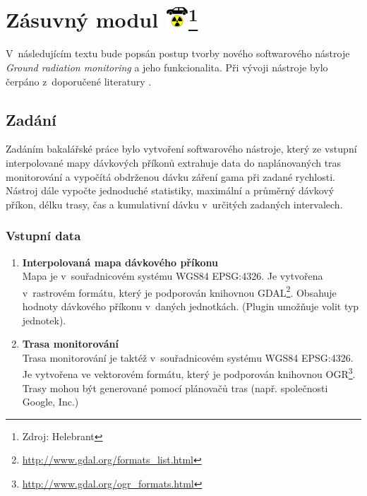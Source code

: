 \chapter[Zásuvný modul]{Zásuvný
modul \includegraphics[scale=0.65]{./pictures/ikonka.png}\footnote{Zdroj:
Helebrant}}
\label{4-plugin}

V~následujícím textu bude popsán postup tvorby nového softwarového
nástroje \textit{Ground radiation monitoring} a jeho
funkcionalita. Při vývoji nástroje bylo čerpáno z~doporučené
literatury \cite{masteringQgis}\cite{diveIntoPython}\cite{rapidPyQt}.

\section{Zadání} Zadáním bakalářské práce bylo vytvoření softwarového
nástroje, který ze vstupní interpolované mapy dávkových příkonů
extrahuje data do naplánovaných tras moni\-torování a vypočítá obdrženou
dávku záření gama při zadané rychlosti. Nástroj dále vypočte
jednoduché statistiky, maximální a průměrný dávkový příkon, délku
trasy, čas a kumulativní dávku v~určitých zadaných intervalech.

\subsection{Vstupní data}
\label{subsec:vstupniData}
\begin{enumerate}
	\item \textbf{Interpolovaná mapa dávkového příkonu} \\ Mapa je
v~souřadnicovém systému WGS84 EPSG:4326. Je vytvořena v~rastrovém
formátu, který je podporován knihovnou
GDAL\footnote{\url{http://www.gdal.org/formats\_list.html}}. Obsahuje
hodnoty dávkového příkonu v~daných jednotkách. (Plugin umožňuje volit
typ jednotek).
	\item \textbf{Trasa monitorování} \\ Trasa monitorování je
taktéž v~souřadnicovém systému WGS84 EPSG:4326. Je vytvořena ve
vektorovém formátu, který je podporován knihovnou
OGR\footnote{\url{http://www.gdal.org/ogr\_formats.html}}. Trasy mohou být
generované pomocí plánovačů tras (např. společnosti Google, Inc.)
\end{enumerate}

